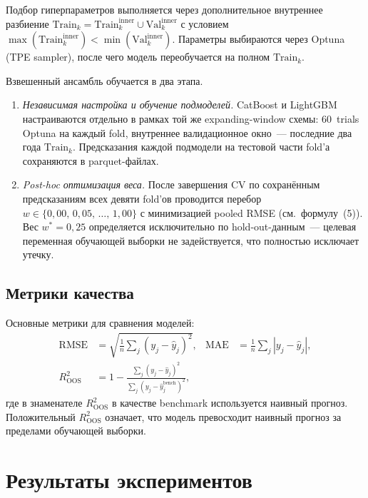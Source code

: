 \documentclass[12pt,a4paper]{article}
\begin{document}
Подбор гиперпараметров выполняется через дополнительное внутреннее
разбиение $\mathrm{Train}_k = \mathrm{Train}^{\text{inner}}_k \cup
\mathrm{Val}^{\text{inner}}_k$ с условием
$\max(\mathrm{Train}^{\text{inner}}_k) < \min(\mathrm{Val}^{\text{inner}}_k)$.
Параметры выбираются через Optuna (TPE sampler), после чего модель
переобучается на полном $\mathrm{Train}_k$.

Взвешенный ансамбль обучается в два этапа.
\begin{enumerate}[leftmargin=*,noitemsep]
  \item \textit{Независимая настройка и обучение подмоделей.}
        CatBoost и LightGBM настраиваются отдельно в рамках той же
        expanding-window схемы: 60~trials Optuna на каждый fold,
        внутреннее валидационное окно~--- последние два года $\mathrm{Train}_k$.
        Предсказания каждой подмодели на тестовой части fold'а сохраняются
        в parquet-файлах.
  \item \textit{Post-hoc оптимизация веса.}
        После завершения CV по сохранённым предсказаниям всех девяти fold'ов
        проводится перебор $w \in \{0{,}00,\,0{,}05,\,\ldots,\,1{,}00\}$
        с минимизацией pooled RMSE (см.~формулу~(5)).
        Вес $w^* = 0{,}25$ определяется исключительно по hold-out-данным~---
        целевая переменная обучающей выборки не задействуется, что полностью
        исключает утечку.
\end{enumerate}

\subsection{Метрики качества}

Основные метрики для сравнения моделей:
\begin{align}
  \mathrm{RMSE} &= \sqrt{\frac{1}{n}\sum_j(y_j - \hat{y}_j)^2}, &
  \mathrm{MAE} &= \frac{1}{n}\sum_j|y_j - \hat{y}_j|, \\[4pt]
  R^2_{\mathrm{OOS}} &= 1 - \frac{\sum_j(y_j-\hat{y}_j)^2}
  {\sum_j(y_j-\hat{y}^{\text{bench}}_j)^2},
\end{align}
где в знаменателе $R^2_{\mathrm{OOS}}$ в качестве benchmark используется
наивный прогноз. Положительный $R^2_{\mathrm{OOS}}$ означает, что модель
превосходит наивный прогноз за пределами обучающей выборки.

\section{Результаты экспериментов}
\end{document}
